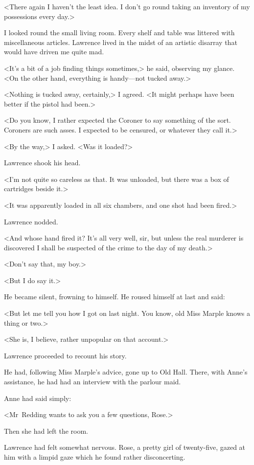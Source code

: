<There again I haven't the least idea. I don't go round taking an inventory of my possessions every day.>

I looked round the small living room. Every shelf and table was littered with miscellaneous articles. Lawrence lived in the midst of an artistic disarray that would have driven me quite mad.

<It's a bit of a job finding things sometimes,> he said, observing my glance. <On the other hand, everything is handy—not tucked away.>

<Nothing is tucked away, certainly,> I agreed. <It might perhaps have been better if the pistol had been.>

<Do you know, I rather expected the Coroner to say something of the sort. Coroners are such asses. I expected to be censured, or whatever they call it.>

<By the way,> I asked. <Was it loaded?>

Lawrence shook his head.

<I'm not quite so careless as that. It was unloaded, but there was a box of cartridges beside it.>

<It was apparently loaded in all six chambers, and one shot had been fired.>

Lawrence nodded.

<And whose hand fired it? It's all very well, sir, but unless the real murderer is discovered I shall be suspected of the crime to the day of my death.>

<Don't say that, my boy.>

<But I do say it.>

He became silent, frowning to himself. He roused himself at last and said:

<But let me tell you how I got on last night. You know, old Miss Marple knows a thing or two.>

<She is, I believe, rather unpopular on that account.>

Lawrence proceeded to recount his story.

He had, following Miss Marple's advice, gone up to Old Hall. There, with Anne's assistance, he had had an interview with the parlour maid.

Anne had said simply:

<Mr~Redding wants to ask you a few questions, Rose.>

Then she had left the room.

Lawrence had felt somewhat nervous. Rose, a pretty girl of twenty-five, gazed at him with a limpid gaze which he found rather disconcerting.

